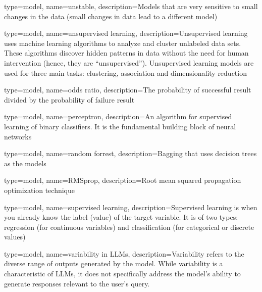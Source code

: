 {
	type=model,
    name=unstable,
    description={Models that are very sensitive to small changes in the data (small changes in data lead to a different model)}
}

{
	type=model,
    name=unsupervised learning,
    description={Unsupervised learning uses machine learning algorithms to analyze and cluster unlabeled data sets. These algorithms discover hidden patterns in data without the need for human intervention (hence, they are ``unsupervised'').  Unsupervised learning models are used for three main tasks: clustering, association and dimensionality reduction}
}

{
	type=model,
    name=odds ratio,
    description={The probability of successful result divided by the probability of failure result}
}

{
	type=model,
    name=perceptron,
    description={An algorithm for supervised learning of binary classifiers.  It is the fundamental building block of neural networks}
}

{
	type=model,
    name=random forrest,
    description={Bagging that uses decision trees as the models}
}

{
	type=model,
    name=RMSprop,
    description={Root mean squared propagation optimization technique}
}

{
	type=model,
    name=supervised learning,
    description={Supervised learning is when you already know the label (value) of the target variable. It is of two types: regression (for continuous variables) and classification (for categorical or discrete values)}
} 

{
	type=model,
    name=variability in LLMs,
    description={Variability refers to the diverse range of outputs generated by the model. While variability is a characteristic of LLMs, it does not specifically address the model's ability to generate responses relevant to the user's query.}
}